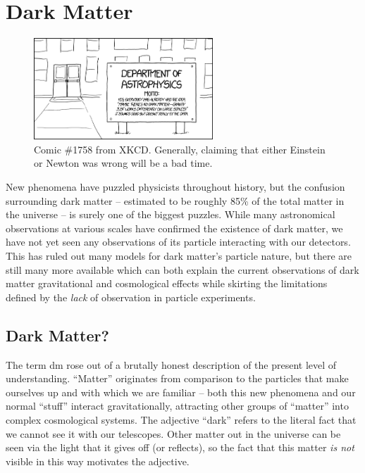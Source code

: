 \chapter{Dark Matter}
\label{chapter:dm}

\begin{figure}[h]
  \centering
  \includegraphics[width=0.6\textwidth]{figures/astrophysics-xkcd-1758.png}
  \caption{Comic \#1758 from XKCD\cite{xkcd}.
  Generally, claiming that either Einstein or Newton was wrong will be a bad time.}
  \label{fig:its-not-mond}
\end{figure}

New phenomena have puzzled physicists throughout history, but the confusion surrounding dark matter
-- estimated to be roughly 85\% of the total matter in the universe -- is surely one of the biggest
puzzles. While many astronomical observations at various scales have confirmed the existence of
dark matter, we have not yet seen any observations of its particle interacting with our detectors.
This has ruled out many models for dark matter's particle nature, but there are still many more
available which can both explain the current observations of dark matter gravitational and
cosmological effects while skirting the limitations defined by the \emph{lack} of observation in
particle experiments.

\section{Dark Matter?}
The term \ac{dm} rose out of a brutally honest description of the present level of understanding.
``Matter'' originates from comparison to the particles that make ourselves up and with which we are
familiar -- both this new phenomena and our normal ``stuff'' interact gravitationally, attracting
other groups of ``matter'' into complex cosmological systems. The adjective ``dark'' refers to the
literal fact that we cannot see it with our telescopes. Other matter out in the universe can be
seen via the light that it gives off (or reflects), so the fact that this matter \emph{is not}
visible in this way motivates the adjective.

